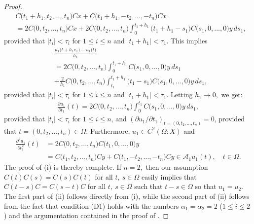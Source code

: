 \documentclass{amsart}
\theoremstyle{definition}
\theoremstyle{remark}
\numberwithin{equation}{section}
\begin{document}
\begin{proof}
\begin{align*}&
C\bigl(t_{1}+h_{1},t_{2},...,t_{n}\bigr)Cx+C\bigl(t_{1}+h_{1},-t_{2},...,-t_{n}\bigr)Cx
\\& =2C\bigl(0,t_{2},...,t_{n}\bigr)Cx+2C\bigl(0,t_{2},...,t_{n}\bigr)\int^{t_{1}+h_{1}}_{0}\bigl(t_{1}+h_{1}-s_{1}\bigr)C\bigl(s_{1},0,...,0\bigr)y\, ds_{1},
\end{align*}  
provided that $|t_{i}|<\tau_{i}$ for $1\leq i\leq n$ and $|t_{1}+h_{1}|<\tau_{1}.$ This implies
\begin{align*} &
\frac{u_{1}\bigl(t+h_{1}e_{1})-u_{1}\bigl(t\bigr) }{h_{1}}
\\& =2C\bigl(0,t_{2},...,t_{n}\bigr)\int^{t_{1}+h_{1}}_{0}C\bigl(s_{1},0,...,0\bigr)y\, ds_{1}\\&
+\frac{2}{h_{1}}C\bigl(0,t_{2},...,t_{n}\bigr)\int^{t_{1}+h_{1}}_{t_{1}}\bigl(t_{1}-s_{1}\bigr)C\bigl(s_{1},0,...,0\bigr)y\, ds_{1},
\end{align*}
provided that $|t_{i}|<\tau_{i}$ for $1\leq i\leq n$ and $|t_{1}+h_{1}|<\tau_{1}.$ Letting $h_{1}\rightarrow 0,$ we get:
\begin{align*}
\frac{\partial u_{1}}{\partial t_{1}}(t)=2C\bigl(0,t_{2},...,t_{n}\bigr)\int^{t_{1}}_{0}C\bigl(s_{1},0,...,0\bigr)y\, ds_{1},
\end{align*} 
provided that $|t_{i}|<\tau_{i}$ for $1\leq i\leq n$, and $(\partial u_{1}/\partial t_{1})_{t=(0,t_{2},...,t_{n})}=0$, provided that $t=(0,t_{2},...,t_{n} ) \in \Omega .$ Furthermore, $u_{1}\in C^{2}(\Omega : X)$ and
\begin{align*}
\frac{\partial^{2} u_{1}}{\partial t_{1}^{2}}(t)&=2C\bigl(0,t_{2},...,t_{n}\bigr)C\bigl(t_{1},0,...,0\bigr)y
\\& =C\bigl(t_{1},t_{2},...,t_{n}\bigr)Cy+C\bigl(t_{1},-t_{2},...,-t_{n}\bigr)Cy\in {\mathcal A}_{1}u_{1}(t),\quad t\in \Omega.
\end{align*}
The proof of (i) is thereby complete. If $n=2,$ then our assumption $C(t)C(s)=C(s)C(t)$ for all $t,\ s\in \Omega$ easily implies that $C(t-s)C=C(s-t)C$ for all $t,\ s\in \Omega$ such that $t-s\in\Omega$ so that $u_{1}=u_{2}.$ The first part of (ii) follows directly from (i), while the second part of (ii) follows from the fact that condition (D1) holds with the numbers $\alpha_{1}=\alpha_{2}=2$ ($1\leq i\leq 2$) and the argumentation contained in the proof of \cite[Theorem 8.1.23]{apsclcs}.


\end{proof}
\end{document}
